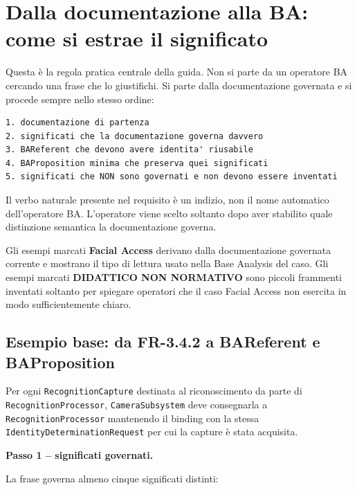\documentclass[11pt,a4paper]{article}
\newcommand{\code}[1]{\nolinkurl{#1}}
\begin{document}
\section{Dalla documentazione alla BA: come si estrae il significato}

Questa è la regola pratica centrale della guida. Non si parte da un operatore BA cercando una frase che lo giustifichi. Si parte dalla documentazione governata e si procede sempre nello stesso ordine:

\begin{lstlisting}
1. documentazione di partenza
2. significati che la documentazione governa davvero
3. BAReferent che devono avere identita' riusabile
4. BAProposition minima che preserva quei significati
5. significati che NON sono governati e non devono essere inventati
\end{lstlisting}

\begin{closedbox}
Il verbo naturale presente nel requisito è un indizio, non il nome automatico dell'operatore BA. L'operatore viene scelto soltanto dopo aver stabilito quale distinzione semantica la documentazione governa.
\end{closedbox}

Gli esempi marcati \textbf{Facial Access} derivano dalla documentazione governata corrente e mostrano il tipo di lettura usato nella Base Analysis del caso. Gli esempi marcati \textbf{DIDATTICO NON NORMATIVO} sono piccoli frammenti inventati soltanto per spiegare operatori che il caso Facial Access non esercita in modo sufficientemente chiaro.

\subsection{Esempio base: da FR-3.4.2 a BAReferent e BAProposition}

\begin{examplebox}
Per ogni \code{RecognitionCapture} destinata al riconoscimento da parte di \code{RecognitionProcessor}, \code{CameraSubsystem} deve consegnarla a \code{RecognitionProcessor} mantenendo il binding con la stessa \code{IdentityDeterminationRequest} per cui la capture è stata acquisita.
\end{examplebox}

\textbf{Passo 1 -- significati governati.}

La frase governa almeno cinque significati distinti:
\end{document}
